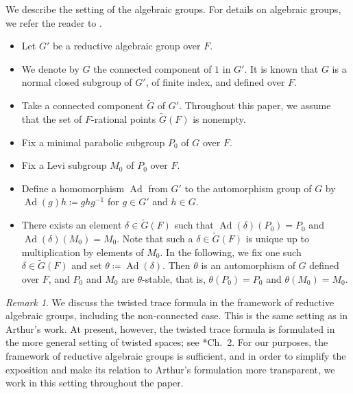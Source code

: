 \documentclass[12pt]{amsart}
\theoremstyle{definition}
\theoremstyle{plain}
\theoremstyle{remark}
\newtheorem{remark}[definition]{Remark}
\DeclareMathOperator{\Ad}{Ad}%
\numberwithin{equation}{section}
\newcommand{\tG}{\widetilde{G}}
\begin{document}
We describe the setting of the algebraic groups.
For details on algebraic groups, we refer the reader to \cites{Bor91,Spr98}.
\begin{itemize}
    \item Let $G'$ be a reductive algebraic group over $F$. 
    \item We denote by $G$ the connected component of $1$ in $G'$. It is known that $G$ is a normal closed subgroup of $G'$, of finite index, and defined over $F$. %
    \item Take a connected component $\tG$ of $G'$. Throughout this paper, we assume that the set of $F$-rational points $\tG(F)$ is nonempty.
    \item Fix a minimal parabolic subgroup $P_0$ of $G$ over $F$. 
    \item Fix a Levi subgroup $M_0$ of $P_0$ over $F$. 
    \item Define a homomorphism $\Ad$ from $G'$ to the automorphism group of $G$ by $\Ad(g)h \coloneqq ghg^{-1}$ for $g \in G'$ and $h \in G$.
    \item  There exists an element $\delta\in \tG(F)$ such that $\Ad(\delta)(P_0)=P_0$ and $\Ad(\delta)(M_0)=M_0$.
    Note that such a $\delta \in \tG(F)$ is unique up to multiplication by elements of $M_0$. 
    In the following, we fix one such $\delta \in \tG(F)$ and set $\theta \coloneqq \Ad(\delta)$.
    Then $\theta$ is an automorphism of $G$ defined over $F$, and $P_0$ and $M_0$ are $\theta$-stable, 
    that is, $\theta(P_0)=P_0$ and $\theta(M_0)=M_0$.
\end{itemize}
\begin{remark}
    We discuss the twisted trace formula in the framework of reductive algebraic groups, including the non-connected case. 
    This is the same setting as in Arthur's work.
    At present, however, the twisted trace formula is formulated in the more general setting of twisted spaces; see \cite{LW13}*{Ch.~2}. 
    For our purposes, the framework of reductive algebraic groups is sufficient, and in order to simplify the exposition and make its relation to Arthur's formulation more transparent, we work in this setting throughout the paper.
\end{remark}
\end{document}
